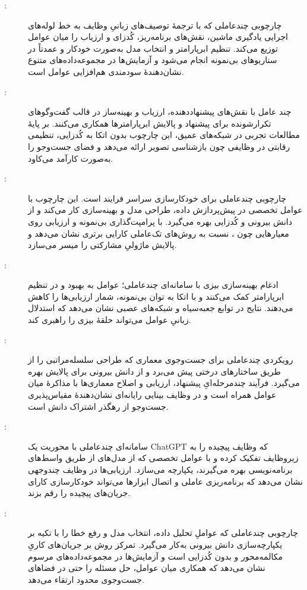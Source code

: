 \begin{description}
    \item[\cite{xu2024largeTextToML}:]
          چارچوبی چندعاملی که با ترجمهٔ توصیف‌های زبانیِ وظایف به خط‌ لوله‌های اجرایی یادگیری ماشین، نقش‌های برنامه‌ریز، کُدزای و ارزیاب را میان عوامل توزیع می‌کند. تنظیم ابرپارامتر و انتخاب مدل به‌صورت خودکار و عمدتاً در سناریوهای بی‌نمونه انجام می‌شود و آزمایش‌ها در مجموعه‌داده‌های متنوع نشان‌دهندهٔ سودمندی هم‌افزایی عوامل است.

    \item[\cite{liu2025agenthpo}:]
          چند عامل با نقش‌های پیشنهاددهنده، ارزیاب و بهینه‌ساز در قالب گفت‌وگوهای تکرارشونده برای پیشنهاد و پالایش ابرپارامترها همکاری می‌کنند. بر پایهٔ مطالعات تجربی در شبکه‌های عمیق، این چارچوب بدون اتکا به کُدزایی، تنظیمی رقابتی در وظایفی چون بازشناسی تصویر ارائه می‌دهد و فضای جست‌وجو را به‌صورت کارآمد می‌کاود.

    \item[\cite{trirat2025automlagent}:]
          چارچوبی چندعاملی برای خودکارسازی سراسر فرایند است. این چارچوب با عوامل تخصصی در پیش‌پردازش داده، طراحی مدل و بهینه‌سازی کار می‌کند و از دانش بیرونی و کُدزایی بهره می‌گیرد.
          با پرامپت‌گذاری بی‌نمونه و ارزیابی روی معیارهایی چون ، نسبت به روش‌های تک‌عاملی کارایی برتری نشان می‌دهد و پالایش ماژولیِ مشارکتی را میسر می‌سازد.

    \item[\cite{liu2024LLAMBO}:]
          ادغام بهینه‌سازی بیزی با سامانه‌ای چندعاملی؛ عوامل به بهبود  و  در تنظیم ابرپارامتر کمک می‌کنند و با اتکا به توان بی‌نمونه، شمار ارزیابی‌ها را کاهش می‌دهند. نتایج در توابع جعبه‌سیاه و شبکه‌های عصبی نشان می‌دهد که استدلال زبانیِ عوامل می‌تواند حلقهٔ بیزی را راهبری کند.

    \item[\cite{Yang_2025_NADER}:]
          رویکردی چندعاملی برای جست‌وجوی معماری که طراحی سلسله‌مراتبی را از طریق ساختارهای درختی پیش می‌برد و از دانش بیرونی برای پالایش بهره می‌گیرد. فرآیند چندمرحله‌ایِ پیشنهاد، ارزیابی و اصلاح معماری‌ها با مذاکرهٔ میان عوامل همراه است و در وظایف بینایی رایانه‌ای نشان‌دهندهٔ مقیاس‌پذیری جست‌وجو از رهگذر اشتراک دانش است.

    \item[\cite{shen2023HuggingGPT}:]
          سامانه‌ای چندعاملی با محوریت یک ChatGPT که وظایف پیچیده را به زیروظایف تفکیک کرده و با عوامل تخصصی که از مدل‌های  از طریق واسط‌های برنامه‌نویسی بهره می‌گیرند، یکپارچه می‌سازد. ارزیابی‌ها در وظایف چندوجهی نشان می‌دهد که برنامه‌ریزی عاملی و اتصال ابزارها می‌تواند خودکارسازی کارای جریان‌های پیچیده را رقم بزند.

    \item[\cite{zhang-etal-2024-MLCopilot}:]
          چارچوبی چندعاملی که عواملِ تحلیل داده، انتخاب مدل و رفع خطا را با تکیه بر یکپارچه‌سازی دانش بیرونی به‌کار می‌گیرد. تمرکز روش بر جریان‌های کاریِ مکالمه‌محور و بدون کُدزایی است و آزمایش‌ها در مجموعه‌داده‌های مرسوم نشان می‌دهد که همکاری میان عوامل، حل مسئله را حتی در فضاهای جست‌وجوی محدود ارتقاء می‌دهد.
\end{description}


